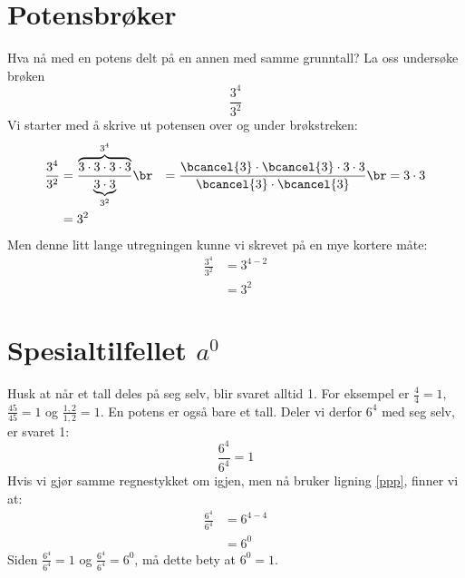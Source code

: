 \section{Potensbrøker}

Hva nå med en potens delt på en annen med samme grunntall? La
oss undersøke brøken
\[ \frac{3^{4}}{3^{2}} \]
Vi starter med å skrive
ut potensen over og under brøkstreken: 
\begin{align*}
\frac{3^{4}}{3^{2}} & =\frac{\overbrace{3\cdot3\cdot3\cdot3}^{3^{4}}}{\underbrace{3\cdot3}_{3^{2}}}\br
 & =\frac{\bcancel{3}\cdot\bcancel{3}\cdot3\cdot3}{\bcancel{3}\cdot\bcancel{3}}\br
 & =3\cdot3\\
 & =3^{2}
\end{align*}
Men denne litt lange utregningen kunne vi skrevet på en mye kortere måte:
\begin{align*}
\frac{3^{4}}{3^{2}} & =3^{4-2}\\
 & =3^{2}
\end{align*}

\eks[1]{\vspace{-20 pt}
\[
\frac{3^{5}}{3^{2}}=3^{5-2}=3^{3}
\]
} 
\eks[2]{\vspace{-20 pt}\[
\frac{2^{4}\cdot5^{3}}{5^{2}\cdot2^{2}}=2^{4-2}\cdot5^{3-2}=2^{2}\cdot5
\]}
\section[Spesialtilfellet $ a^0 $]{\boldmath Spesialtilfellet $ a^0 $}
Husk at når et tall deles på seg selv, blir
svaret alltid 1. For eksempel er ${\frac{4}{4}=1}$, ${\frac{45}{45}=1}$ og ${\frac{1,2}{1,2}=1}$. En potens er også bare et tall. Deler vi derfor $6^{4}$ med seg selv,
er svaret 1:
\[
\frac{6^{4}}{6^{4}}=1
\]
Hvis vi gjør samme regnestykket om igjen, men nå bruker ligning \eqref{ppp},
finner vi at:
\begin{align*}
\frac{6^{4}}{6^{4}} & =6^{4-4}\\
 & =6^{0}
\end{align*}
Siden ${\frac{6^{4}}{6^{4}}=1}$ og ${\frac{6^{4}}{6^{4}}=6^{0}}$,
må dette bety at ${6^{0}=1}$. 
\eks[1]{\vs \vs\[
1000^{0}=1
\]}
\eks[2]{\vs \vs\[
(-4)^{0}=1
\]}
